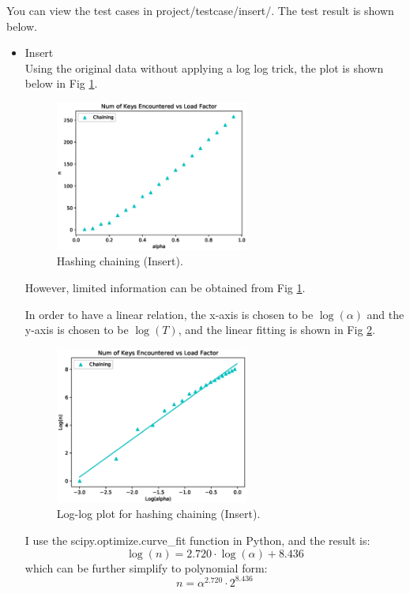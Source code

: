 \documentclass{article}
\begin{document}
\begin{spacing}{1.2}
You can view the test cases in project/testcase/insert/. The test result is shown below.
\begin{itemize}
    \item Insert\\
    Using the original data without applying a log log trick, the plot is shown below in Fig \ref{chain-origin}.
    \begin{figure}[!htb]
        \centering
        \includegraphics[width=0.6\textwidth]{../output/fig/insert_original_chain.eps}
        \caption{Hashing chaining (Insert).}
        \label{chain-origin}
    \end{figure}

    However, limited information can be obtained from Fig \ref{chain-origin}.

    In order to have a linear relation, the x-axis is chosen to be $\log(\alpha)$ and the y-axis is chosen to be $\log(T)$, and the linear fitting is shown in Fig \ref{chain-insert}.
    \begin{figure}[!htb]
        \centering
        \includegraphics[width=0.6\textwidth]{../output/fig/insert_chain.eps}
        \caption{Log-log plot for hashing chaining (Insert).}
        \label{chain-insert}
    \end{figure}

    I use the scipy.optimize.curve\_fit function in Python, and the result is:
    \begin{equation*}
        \log(n) = 2.720 \cdot \log(\alpha) + 8.436
    \end{equation*}
    which can be further simplify to polynomial form:
    \begin{equation*}
        n = \alpha^{2.720}\cdot 2^{8.436}
    \end{equation*}


\end{itemize}
\end{spacing}
\end{document}
